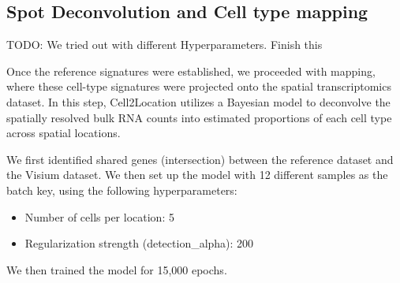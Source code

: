 \documentclass[a4paper,12pt]{article}
\begin{document}
\subsection{Spot Deconvolution and Cell type mapping}
TODO: We tried out with different Hyperparameters. Finish this

Once the reference signatures were established, we proceeded with mapping, where these cell-type signatures were projected onto the spatial transcriptomics dataset. In this step, Cell2Location utilizes a Bayesian model to deconvolve the spatially resolved bulk RNA counts into estimated proportions of each cell type across spatial locations.

We first identified shared genes (intersection) between the reference dataset and the Visium dataset. We then set up the model with 12 different samples as the batch key, using the following hyperparameters:
\begin{itemize}
    \item{Number of cells per location: 5}
    \item{Regularization strength (detection\_alpha): 200}
\end{itemize}
We then trained the model for 15,000 epochs.
\end{document}
